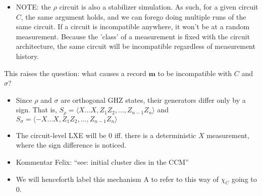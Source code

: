 \begin{itemize}
    \item NOTE: the $\rho$ circuit is also a stabilizer simulation.  As such, for
      a given circuit $C$, the same argument holds, and we can forego doing
      multiple runs of the same circuit. If a circuit is incompatible anywhere,
      it won't be at a random measurement.  Because the 'class' of a measurement
      is fixed with the circuit architecture, the same circuit will be
      incompatible regardless of measurement history.
  \end{itemize}

  This raises the question: what causes a record $\mathbf{m}$ to be incompatible
  with $C$ and $\sigma$?
  \begin{itemize}
    \item Since $\rho$ and $\sigma$ are orthogonal GHZ states, their generators
      differ only by a sign. That is, $S_\rho = \langle X\ldots X,
      Z_1Z_2,\ldots,Z_{n-1}Z_n\rangle$ and $S_\sigma = \langle -X\ldots X,
      Z_1Z_2,\ldots,Z_{n-1}Z_n\rangle$
    \item The circuit-level LXE will be $0$ iff. there is a deterministic $X$
      measurement, where the sign difference is noticed.

    \item \textcolor{kw-olive}{Kommentar Felix: \enquote{see: initial cluster dies in
      the CCM}}

  \item We will henceforth label this mechanism \textsf{A} to refer to this way of
    $\chi_C$ going to $0$.
\end{itemize}

